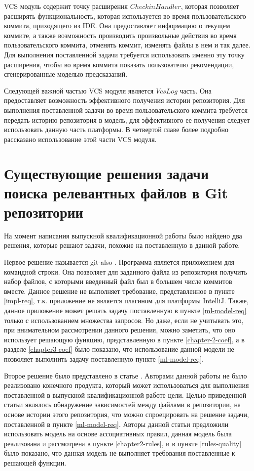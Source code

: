 VCS модуль содержит точку расширения $CheckinHandler$, которая позволяет расширять функциональность, которая используется во время пользовательского коммита, приходящего из IDE. Она предоставляет информацию о текущем коммите, а также возможность производить произвольные действия во время пользовательского коммита, отменять коммит, изменять файлы в нем и так далее. Для выполнения поставленной задачи требуется использовать именно эту точку расширения, чтобы во время коммита показать пользователю рекомендации, сгенерированные моделью предсказаний.

Следующей важной частью VCS модуля является $VcsLog$ часть. Она предоставляет возможность эффективного получения истории репозитория. Для выполнения поставленной задачи во время пользовательского коммита требуется передать историю репозитория в модель, для эффективного ее получения следует использовать данную часть платформы. В четвертой главе более подробно рассказано использование этой части VCS модуля.


\section{Существующие решения задачи поиска релевантных файлов в Git репозитории}\label{git-also-anvaka-label}
На момент написания выпускной квалификационной работы было найдено два решения, которые решают задачи, похожие на поставленную в данной работе. 

Первое решение называется git-also \cite{git-also-anvaka}. Программа является приложением для командной строки. Она позволяет для заданного файла из репозитория получить набор файлов, с которыми введенный файл был в большем числе коммитов вместе. Данное решение не выполняет требование, представленное в пункте \ref{impl-req}, т.к. приложение не является плагином для платформы IntelliJ. Также, данное приложение может решать задачу поставленную в пункте \ref{ml-model-req} только с использованием множества запросов. Но даже, если не учитывать это, при внимательном рассмотрении данного решения, можно заметить, что оно использует решающую функцию, представленную в пункте \ref{chapter-2-coef}, а в разделе \ref{chapter3-coef} было показано, что использование данной модели не позволяет выполнить задачу поставленную пункте \ref{ml-model-req}.

Второе решение было представлено в статье \cite{hagward2015using}. Авторами данной работы не было реализовано конечного продукта, который может использоваться для выполнения поставленной в выпускной квалификационной работе цели. Целью приведенной статьи являлось обнаружение зависимостей между файлами в репозитории, на основе истории этого репозитория, что можно спроецировать на решение задачи, поставленной в пункте \ref{ml-model-req}. Авторы данной статьи предложили использовать модель на основе ассоциативных правил, данная модель была реализована и рассмотрена в пункте \ref{chapter2-rules}, и в пункте \ref{rules-quality} было показано, что данная модель не выполняет требования поставленные к решающей функции.
 

